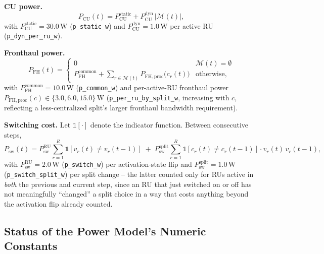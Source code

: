 \textbf{CU power.}
\begin{equation}
  P_{\mathrm{CU}}(t) = P_{\mathrm{CU}}^{\mathrm{static}} + P_{\mathrm{CU}}^{\mathrm{dyn}} \, |\mathcal{M}(t)|,
  \label{eq:oran-cu-power}
\end{equation}
with $P_{\mathrm{CU}}^{\mathrm{static}} = 30.0\,\mathrm{W}$
(\texttt{p\_static\_w}) and $P_{\mathrm{CU}}^{\mathrm{dyn}} = 1.0\,\mathrm{W}$
per active RU (\texttt{p\_dyn\_per\_ru\_w}).

\textbf{Fronthaul power.}
\begin{equation}
  P_{\mathrm{FH}}(t) =
  \begin{cases}
    0 & \mathcal{M}(t) = \emptyset \\[2pt]
    P_{\mathrm{FH}}^{\mathrm{common}} + \displaystyle\sum_{r \in \mathcal{M}(t)} P_{\mathrm{FH,proc}}\big(c_r(t)\big) & \text{otherwise,}
  \end{cases}
  \label{eq:oran-fh-power}
\end{equation}
with $P_{\mathrm{FH}}^{\mathrm{common}} = 10.0\,\mathrm{W}$
(\texttt{p\_common\_w}) and per-active-RU fronthaul power
$P_{\mathrm{FH,proc}}(c) \in \{3.0, 6.0, 15.0\}\,\mathrm{W}$
(\texttt{p\_per\_ru\_by\_split\_w}, increasing with $c$, reflecting a
less-centralized split's larger fronthaul bandwidth requirement).

\textbf{Switching cost.} Let $\mathbb{1}[\cdot]$ denote the indicator
function. Between consecutive steps,
\begin{equation}
  P_{\mathrm{sw}}(t) = P_{\mathrm{sw}}^{\mathrm{RU}} \sum_{r=1}^{R} \mathbb{1}\!\left[v_r(t) \neq v_r(t-1)\right]
  \; + \; P_{\mathrm{sw}}^{\mathrm{split}} \sum_{r=1}^{R} \mathbb{1}\!\left[c_r(t) \neq c_r(t-1)\right] \cdot v_r(t)\, v_r(t-1),
  \label{eq:oran-switch-power}
\end{equation}
with $P_{\mathrm{sw}}^{\mathrm{RU}} = 2.0\,\mathrm{W}$
(\texttt{p\_switch\_w}) per activation-state flip and
$P_{\mathrm{sw}}^{\mathrm{split}} = 1.0\,\mathrm{W}$
(\texttt{p\_switch\_split\_w}) per split change -- the latter counted only
for RUs active in \emph{both} the previous and current step, since an RU
that just switched on or off has not meaningfully ``changed'' a split
choice in a way that costs anything beyond the activation flip already
counted.

\subsection{Status of the Power Model's Numeric Constants}
\label{sec:oran-power-validation}

